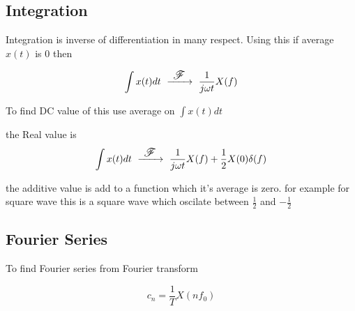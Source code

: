 \newcommand{\FourierTransform}{~ \xrightarrow{ \text{\large $~\mathscr{F}~$}} ~}
\subsection{Integration}
Integration is inverse of differentiation in many respect. Using this if average $x(t)$ is 0 then

\begin{equation}
\int x(t) dt \FourierTransform \frac{1}{j \omega t} X(f)
\end{equation}

To find DC value of this use average on $ \int x(t) dt $

the Real value is 
\begin{equation}
\int x(t) dt \FourierTransform \frac{1}{j \omega t} X(f) + \frac{1}{2}X(0)\delta(f)
\end{equation}

the additive value is add to a function which it's average is zero. for example for square wave this is a square wave which oscilate between $\frac{1}{2}$ and $-\frac{1}{2}$

\subsection{Fourier Series}
To find Fourier series from Fourier transform

\begin{equation}
c_n = \frac{1}{T} X(n f_0)
\end{equation}

